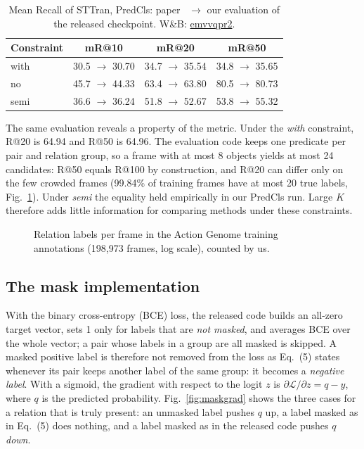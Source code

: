 \documentclass[conference,a4paper]{IEEEtran}
\newcommand{\wb}[2]{\href{https://wandb.ai/nhantrnh-graphml/#1}{{\normalfont\ttfamily #2}}}
\begin{document}
\begin{table}[!t]
\centering
\caption{Mean Recall of STTran, PredCls: paper~\cite{impartail} $\to$ our evaluation of the released checkpoint. W\&B: \wb{impartail-repro/runs/emvvqpr2}{emvvqpr2}.}
\label{tab:it}
\small
\setlength{\tabcolsep}{4pt}
\begin{tabular}{lccc}
\toprule
Constraint & mR@10 & mR@20 & mR@50\\
\midrule
with & 30.5 $\to$ 30.70 & 34.7 $\to$ 35.54 & 34.8 $\to$ 35.65\\
no & 45.7 $\to$ 44.33 & 63.4 $\to$ 63.80 & 80.5 $\to$ 80.73\\
semi & 36.6 $\to$ 36.24 & 51.8 $\to$ 52.67 & 53.8 $\to$ 55.32\\
\bottomrule
\end{tabular}
\end{table}

The same evaluation reveals a property of the metric. Under the \emph{with} constraint,
R@20 is 64.94 and R@50 is 64.96. The evaluation code keeps one predicate per pair and
relation group, so a frame with at most 8 objects yields at most 24 candidates: R@50 equals
R@100 by construction, and R@20 can differ only on the few crowded frames (99.84\% of
training frames have at most 20 true labels, Fig.~\ref{fig:perframe}). Under \emph{semi} the
equality held empirically in our PredCls run. Large $K$ therefore adds little information
for comparing methods under these constraints.

\begin{figure}[!t]
\centering
\resizebox{\columnwidth}{!}{}
\caption{Relation labels per frame in the Action Genome training annotations (198,973 frames, log scale), counted by us.}
\label{fig:perframe}
\end{figure}

\subsection{The mask implementation}
\label{sec:i2}
With the binary cross-entropy (BCE) loss, the released code builds an all-zero target
vector, sets 1 only for labels that are \emph{not masked}, and averages BCE over the whole
vector; a pair whose labels in a group are all masked is skipped. A masked positive label
is therefore not removed from the loss as Eq.~(5) states whenever its pair keeps another
label of the same group: it becomes a \emph{negative label}. With a sigmoid, the gradient with respect to the logit
$z$ is $\partial\mathcal{L}/\partial z=q-y$, where $q$ is the predicted probability.
Fig.~\ref{fig:maskgrad} shows the three cases for a relation that is truly present: an
unmasked label pushes $q$ up, a label masked as in Eq.~(5) does nothing, and a label masked
as in the released code pushes $q$ \emph{down}.
\end{document}
